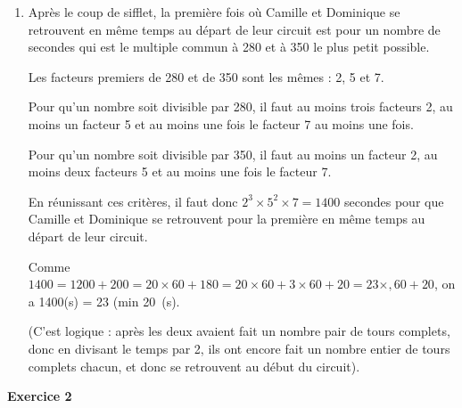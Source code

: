 \documentclass{article}
\begin{document}
\begin{enumerate}
\begin{enumerate}
Au bout de ces \num{2800}, Dominique a donc parcouru exactement 8 parcours 2  : elle est donc au départ.
	\item Après le coup de sifflet, la première fois où Camille et Dominique se retrouvent en même temps au départ de leur circuit est pour un nombre de secondes qui est le multiple commun à 280 et à 350 le plus petit possible.

Les facteurs premiers de 280 et de 350 sont les mêmes : 2, 5 et 7.

Pour qu'un nombre soit divisible par 280, il faut au moins trois facteurs 2, au moins un facteur 5 et au moins une fois le facteur 7 au moins une fois.

Pour qu'un nombre soit divisible par 350, il faut au moins un facteur 2, au moins deux facteurs 5 et au moins une fois le facteur 7.

En réunissant ces critères, il faut donc $2^3 \times 5^2 \times 7 = \num{1400}$ secondes pour que Camille et Dominique se retrouvent pour la première en même temps au départ de leur circuit.

Comme $\num{1400} = \num{1200} + 200 = 20 \times 60 + 180 = 20 \times 60 + 3 \times 60 + 20 = 23 \times ,60 + 20$, on a \num{1400}(s) = 23 (min 20~(s).

(C'est logique : après  les deux avaient fait un nombre pair de tours complets, donc en divisant le temps par 2, ils ont encore fait un nombre entier de tours complets chacun, et donc se retrouvent au début du circuit).
	\end{enumerate}
\end{enumerate}

\newpage
\textbf{Exercice 2}

\smallskip
\end{document}
